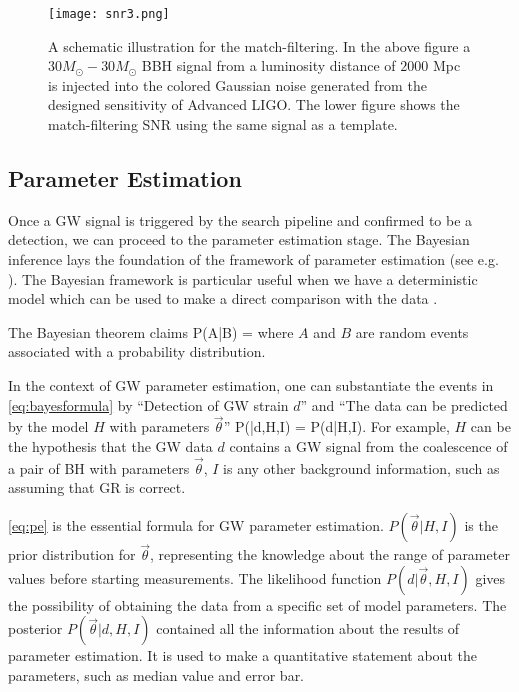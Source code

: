 \begin{figure}[htbp] %
   \centering
   \texttt{[image: snr3.png]} 
   \caption{A schematic illustration for the match-filtering. In the above figure a $30M_\odot-30M_\odot$ \ac{BBH} signal from a luminosity distance of $2000$ Mpc is injected into the colored Gaussian noise generated from the designed sensitivity of Advanced LIGO. The lower figure shows the match-filtering \ac{SNR} using the same signal as a template.}
   \label{fig:snr}
\end{figure}


\subsection{Parameter Estimation}\label{subsec:pe}

Once a \ac{GW} signal is triggered by the search pipeline and confirmed to be a detection, we can proceed to the parameter estimation stage.
The Bayesian inference lays the foundation of the framework of parameter estimation (see e.g. \cite{sivia2006data}).
The Bayesian framework is particular useful when we have a deterministic model which can be used to make a direct comparison with the data \cite{bayesintro}.

The Bayesian theorem claims
\be\label{eq:bayesformula}
P(A|B) = 
\ee
where $A$ and $B$ are random events associated with a probability distribution.

In the context of \ac{GW} parameter estimation, one can substantiate the events in \cref{eq:bayesformula} by ``Detection of \ac{GW} strain $d$'' and ``The data can be predicted by the model $H$ with parameters $\vec{\theta}$''
\be\label{eq:pe}
P(\vec{\theta}|d,H,I) =  {P(d|H,I)}.
\ee
For example, $H$ can be the hypothesis that the \ac{GW} data $d$ contains a \ac{GW} signal from the coalescence of a pair of \ac{BH} with parameters $\vec\theta$, $I$ is any other background information, such as assuming that \ac{GR} is correct.

\cref{eq:pe} is the essential formula for \ac{GW} parameter estimation. 
$P(\vec{\theta}|H,I)$ is the prior distribution for $\vec{\theta}$, representing the knowledge about the range of parameter values before starting measurements. 
The likelihood function $P(d|\vec{\theta},H,I)$ gives the possibility of obtaining the data from a specific set of model parameters.
The posterior $P(\vec{\theta}|d,H,I)$ contained all the information about the results of parameter estimation.
It is used to make a quantitative statement about the parameters, such as median value and error bar.

